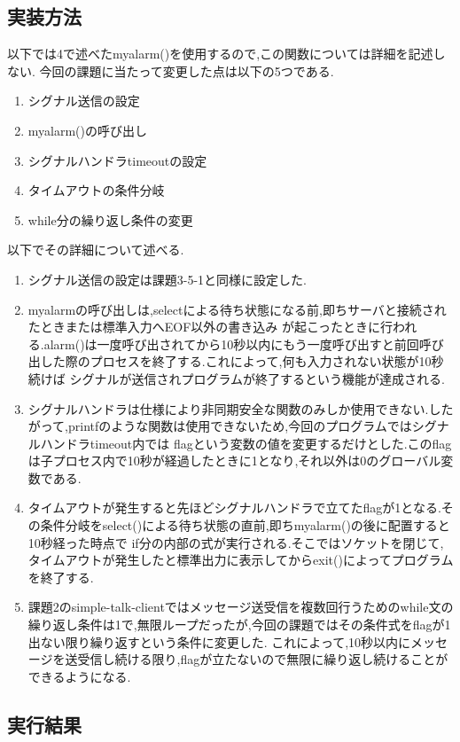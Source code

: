 \documentclass[dvipdfmx]{jarticle}
\begin{document}
\subsection{実装方法}
以下では4で述べたmyalarm()を使用するので,この関数については詳細を記述しない.
今回の課題に当たって変更した点は以下の5つである.
\begin{enumerate}
    \item シグナル送信の設定
    \item myalarm()の呼び出し
    \item シグナルハンドラtimeoutの設定
    \item タイムアウトの条件分岐
    \item while分の繰り返し条件の変更
\end{enumerate}
以下でその詳細について述べる.
\begin{enumerate}
    \item シグナル送信の設定は課題3-5-1と同様に設定した.
    \item myalarmの呼び出しは,selectによる待ち状態になる前,即ちサーバと接続されたときまたは標準入力へEOF以外の書き込み
    が起こったときに行われる.alarm()は一度呼び出されてから10秒以内にもう一度呼び出すと前回呼び出した際のプロセスを終了する.これによって,何も入力されない状態が10秒続けば
    シグナルが送信されプログラムが終了するという機能が達成される.
    \item シグナルハンドラは仕様により非同期安全な関数のみしか使用できない.したがって,printfのような関数は使用できないため,今回のプログラムではシグナルハンドラtimeout内では
    flagという変数の値を変更するだけとした.このflagは子プロセス内で10秒が経過したときに1となり,それ以外は0のグローバル変数である.
    \item タイムアウトが発生すると先ほどシグナルハンドラで立てたflagが1となる.その条件分岐をselect()による待ち状態の直前,即ちmyalarm()の後に配置すると10秒経った時点で
    if分の内部の式が実行される.そこではソケットを閉じて,タイムアウトが発生したと標準出力に表示してからexit()によってプログラムを終了する.
    \item 課題2のsimple-talk-clientではメッセージ送受信を複数回行うためのwhile文の繰り返し条件は1で,無限ループだったが,今回の課題ではその条件式をflagが1出ない限り繰り返すという条件に変更した.
    これによって,10秒以内にメッセージを送受信し続ける限り,flagが立たないので無限に繰り返し続けることができるようになる.
\end{enumerate}
\subsection{実行結果}
\end{document}
